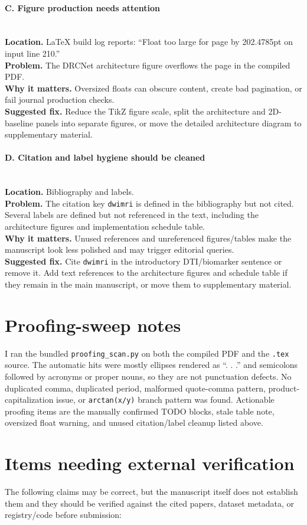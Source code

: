 \documentclass[11pt]{article}
\newcommand{\findingtitle}[1]{\paragraph{#1}\mbox{}\\}
\newcommand{\loc}[1]{\textbf{Location.} #1\\}
\newcommand{\problem}[1]{\textbf{Problem.} #1\\}
\newcommand{\why}[1]{\textbf{Why it matters.} #1\\}
\newcommand{\fix}[1]{\textbf{Suggested fix.} #1\par}
\begin{document}
\findingtitle{C. Figure production needs attention}
\loc{LaTeX build log reports: ``Float too large for page by 202.4785pt on input line 210.''}
\problem{The DRCNet architecture figure overflows the page in the compiled PDF.}
\why{Oversized floats can obscure content, create bad pagination, or fail journal production checks.}
\fix{Reduce the TikZ figure scale, split the architecture and 2D-baseline panels into separate figures, or move the detailed architecture diagram to supplementary material.}

\findingtitle{D. Citation and label hygiene should be cleaned}
\loc{Bibliography and labels.}
\problem{The citation key \texttt{dwimri} is defined in the bibliography but not cited. Several labels are defined but not referenced in the text, including the architecture figures and implementation schedule table.}
\why{Unused references and unreferenced figures/tables make the manuscript look less polished and may trigger editorial queries.}
\fix{Cite \texttt{dwimri} in the introductory DTI/biomarker sentence or remove it. Add text references to the architecture figures and schedule table if they remain in the main manuscript, or move them to supplementary material.}

\section*{Proofing-sweep notes}

I ran the bundled \texttt{proofing\_scan.py} on both the compiled PDF and the \texttt{.tex} source. The automatic hits were mostly ellipses rendered as ``. . .'' and semicolons followed by acronyms or proper nouns, so they are not punctuation defects. No duplicated comma, duplicated period, malformed quote-comma pattern, product-capitalization issue, or \texttt{arctan(x/y)} branch pattern was found. Actionable proofing items are the manually confirmed TODO blocks, stale table note, oversized float warning, and unused citation/label cleanup listed above.

\section*{Items needing external verification}

The following claims may be correct, but the manuscript itself does not establish them and they should be verified against the cited papers, dataset metadata, or registry/code before submission:
\end{document}
